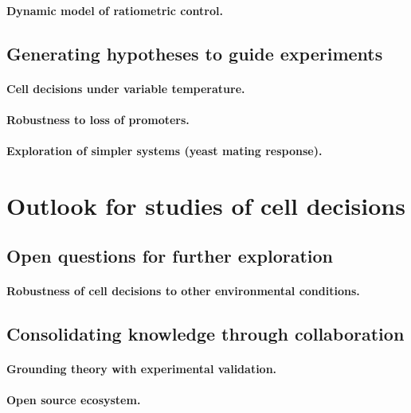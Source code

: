 		\paragraph{Dynamic model of ratiometric control.}		
		
	\subsection{Generating hypotheses to guide experiments}
		\paragraph{Cell decisions under variable temperature.}		
		\paragraph{Robustness to loss of promoters.}
		\paragraph{Exploration of simpler systems (yeast mating response).}
		
\section{Outlook for studies of cell decisions}

	\subsection{Open questions for further exploration}
		\paragraph{Robustness of cell decisions to other environmental conditions.}	
					
	\subsection{Consolidating knowledge through collaboration}
	
		\paragraph{Grounding theory with experimental validation.}		
		\paragraph{Open source ecosystem.}
